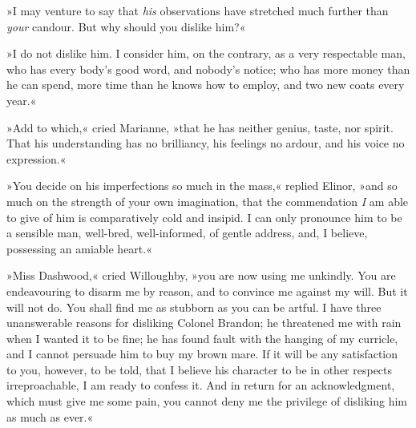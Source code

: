 »I may venture to say that \textit{his} observations have stretched much further than \textit{your} candour. But why should you dislike him?«

»I do not dislike him. I consider him, on the contrary, as a very respectable man, who has every body’s good word, and nobody’s notice; who has more money than he can spend, more time than he knows how to employ, and two new coats every year.«

»Add to which,« cried Marianne, »that he has neither genius, taste, nor spirit. That his understanding has no brilliancy, his feelings no ardour, and his voice no expression.«

»You decide on his imperfections so much in the mass,« replied Elinor, »and so much on the strength of your own imagination, that the commendation \textit{I} am able to give of him is comparatively cold and insipid. I can only pronounce him to be a sensible man, well-bred, well-informed, of gentle address, and, I believe, possessing an amiable heart.«

»Miss Dashwood,« cried Willoughby, »you are now using me unkindly. You are endeavouring to disarm me by reason, and to convince me against my will. But it will not do. You shall find me as stubborn as you can be artful. I have three unanswerable reasons for disliking Colonel Brandon; he threatened me with rain when I wanted it to be fine; he has found fault with the hanging of my curricle, and I cannot persuade him to buy my brown mare. If it will be any satisfaction to you, however, to be told, that I believe his character to be in other respects irreproachable, I am ready to confess it. And in return for an acknowledgment, which must give me some pain, you cannot deny me the privilege of disliking him as much as ever.«